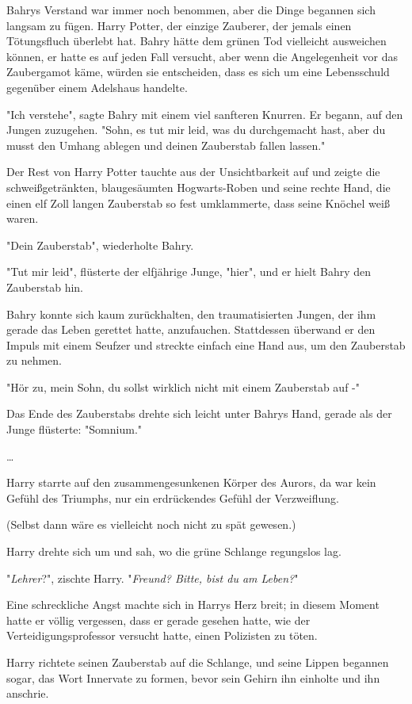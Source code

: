 {Bahrys Verstand war immer noch benommen, aber die Dinge begannen sich langsam zu fügen. Harry Potter, der einzige Zauberer, der jemals einen Tötungsfluch überlebt hat. Bahry hätte dem grünen Tod vielleicht ausweichen können, er hatte es auf jeden Fall versucht, aber wenn die Angelegenheit vor das Zaubergamot käme, würden sie entscheiden, dass es sich um eine Lebensschuld gegenüber einem Adelshaus handelte.

"Ich verstehe", sagte Bahry mit einem viel sanfteren Knurren. Er begann, auf den Jungen zuzugehen. "Sohn, es tut mir leid, was du durchgemacht hast, aber du musst den Umhang ablegen und deinen Zauberstab fallen lassen."

Der Rest von Harry Potter tauchte aus der Unsichtbarkeit auf und zeigte die schweißgetränkten, blaugesäumten Hogwarts-Roben und seine rechte Hand, die einen elf Zoll langen Zauberstab so fest umklammerte, dass seine Knöchel weiß waren.

"Dein Zauberstab", wiederholte Bahry.

"Tut mir leid", flüsterte der elfjährige Junge, "hier", und er hielt Bahry den Zauberstab hin.

Bahry konnte sich kaum zurückhalten, den traumatisierten Jungen, der ihm gerade das Leben gerettet hatte, anzufauchen. Stattdessen überwand er den Impuls mit einem Seufzer und streckte einfach eine Hand aus, um den Zauberstab zu nehmen.

"Hör zu, mein Sohn, du sollst wirklich nicht mit einem Zauberstab auf -"

Das Ende des Zauberstabs drehte sich leicht unter Bahrys Hand, gerade als der Junge flüsterte: "Somnium."

…

Harry starrte auf den zusammengesunkenen Körper des Aurors, da war kein Gefühl des Triumphs, nur ein erdrückendes Gefühl der Verzweiflung.

(Selbst dann wäre es vielleicht noch nicht zu spät gewesen.)

Harry drehte sich um und sah, wo die grüne Schlange regungslos lag.

"\emph{Lehrer}?", zischte Harry. "\emph{Freund? Bitte, bist du am Leben?}"

Eine schreckliche Angst machte sich in Harrys Herz breit; in diesem Moment hatte er völlig vergessen, dass er gerade gesehen hatte, wie der Verteidigungsprofessor versucht hatte, einen Polizisten zu töten.

Harry richtete seinen Zauberstab auf die Schlange, und seine Lippen begannen sogar, das Wort Innervate zu formen, bevor sein Gehirn ihn einholte und ihn anschrie.

}
